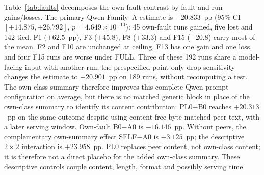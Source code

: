 \documentclass[conference]{IEEEtran}
\newcommand{\cond}[1]{\textsf{#1}}
\begin{document}
\begin{table}[t]
\centering\footnotesize
\caption{New 256-run follow-up. Correctness and contrasts are percentage points (pp) at the fixed denominator. Family A uses 192 own-fault physical runs; Family B uses 24 runs per fault, averaging seven locally unseen receivers within run. The gpt-oss rows are exploratory descriptive, not additional tests.}
\label{tab:t2main}
\setlength{\tabcolsep}{4pt}

\end{table}

\begin{table}[t]
\centering\footnotesize
\caption{Follow-up Qwen operational accuracy by receiver role and terminal response state, all at planned denominators (2,048 pairs per LLM arm). Abstentions, parser rejections and truncations are retained as non-correct. Numerical rules issue one receiver-independent prediction per case and have no LLM response states.}
\label{tab:t2arms}
\setlength{\tabcolsep}{5pt}

\end{table}

Table~\ref{tab:faults} decomposes the own-fault contrast by fault and run gains/losses. The primary Qwen Family~A estimate is $+20.833$~pp (95\% CI $[+14.875,+26.792]$, $p=4.649\times10^{-10}$): 45 own-fault runs gained, five lost and 142 tied. F1 ($+62.5$~pp), F3 ($+45.8$), F8 ($+33.3$) and F15 ($+20.8$) carry most of the mean. F2 and F10 are unchanged at ceiling, F13 has one gain and one loss, and four F15 runs are worse under \cond{FULL}. Three of these 192 runs share a model-facing input with another run; the prespecified point-only drop sensitivity changes the estimate to $+20.901$~pp on 189 runs, without recomputing a test. The own-class summary therefore improves this complete Qwen prompt configuration on average, but there is no matched generic block in place of the own-class summary to identify its content contribution: \cond{PL0}$-$\cond{B0} reaches $+20.313$~pp on the same outcome despite using content-free byte-matched peer text, with a later serving window. Own-fault \cond{B0}$-$\cond{A0} is $-16.146$~pp. Without peers, the complementary own-summary effect \cond{SELF}$-$\cond{A0} is $-3.125$~pp; the descriptive $2\times2$ interaction is $+23.958$~pp. PL0 replaces peer content, not own-class content; it is therefore not a direct placebo for the added own-class summary. These descriptive controls couple content, length, format and possibly serving time.

\begin{table}[t]
\centering\footnotesize
\caption{Qwen fault-level follow-up. The own-fault column is the paired \cond{FULL}$-$\cond{B0} difference (24 runs/fault); local-unseen columns are fixed-denominator accuracy across seven receivers (168 pairs/fault). These rows are descriptive except the separately tested F1 and F8 contrasts in Table~\ref{tab:t2main}.}
\label{tab:faults}
\setlength{\tabcolsep}{2.5pt}

\end{table}
\end{document}
